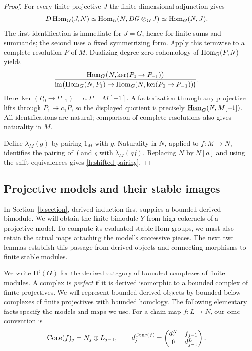 \begin{proof}
For every finite projective $J$ the finite-dimensional adjunction gives
\[
 D\operatorname{Hom}_G(J,N)\simeq\operatorname{Hom}_G(N,DG\otimes_GJ)\simeq\operatorname{Hom}_G(N,J).
\]
The first identification is immediate for $J=G$, hence for finite sums
and summands; the second uses a fixed symmetrizing form. Apply this
termwise to a complete resolution $P$ of $M$. Dualizing degree-zero
cohomology of $\operatorname{Hom}_G(P,N)$ yields
\[
 \frac{\operatorname{Hom}_G\bigl(N,\ker(P_0\to P_{-1})\bigr)}
 {\operatorname{im}\bigl(\operatorname{Hom}_G(N,P_1)\to
                \operatorname{Hom}_G(N,\ker(P_0\to P_{-1}))\bigr)}.
\]
Here $\ker(P_0\to P_{-1})=c_1P=M[-1]$. A factorization through any
projective lifts through $P_1\twoheadrightarrow c_1P$, so the displayed
quotient is precisely $\underline{\operatorname{Hom}}_G(N,M[-1])$. All identifications are natural;
comparison of complete resolutions also gives naturality in $M$.

Define $\lambda_M(g)$ by pairing $1_M$ with $g$. Naturality in $N$, applied
to $f:M\to N$, identifies the pairing of $f$ and $g$ with
$\lambda_M(gf)$. Replacing $N$ by $N[a]$ and using the shift equivalences
gives \eqref{h:shifted-pairing}.
\end{proof}

\subsection{Projective models and their stable images}

In Section~\ref{b:section}, derived induction first supplies a bounded
derived bimodule. We will obtain the finite bimodule $Y$ from high
cokernels of a projective model. To compute its evaluated stable Hom
groups, we must also retain the actual maps attaching the model's
successive pieces. The next two lemmas establish this passage from
derived objects and connecting morphisms to finite stable modules.

We write $\mathrm D^b(G)$ for the derived category of bounded complexes of
finite modules. A complex is \emph{perfect} if it is derived isomorphic to
a bounded complex of finite projectives. We will represent bounded derived
objects by bounded-below complexes of finite projectives with bounded
homology. The following elementary facts specify the models and maps we use.
For a chain map $f:L\to N$, our cone convention is
\begin{equation}\label{h:cone}
 \operatorname{Cone}(f)_j=N_j\oplus L_{j-1},\qquad
 d_j^{\operatorname{Cone}(f)}=
 \begin{pmatrix}d_j^N&f_{j-1}\\0&d_{j-1}^L\end{pmatrix}.
\end{equation}

